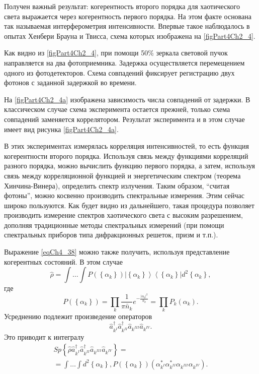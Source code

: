 Получен важный результат: когерентность второго порядка для
хаотического света выражается через когерентность первого порядка. На
этом факте основана так называемая интерферометрия
интенсивности. Впервые такое наблюдалось в опытах Хенбери Брауна и
Твисса, схема которых изображена на \autoref{figPart4Ch2_4}.



Как видно из \autoref{figPart4Ch2_4}, при помощи 50\% зеркала
световой пучок направляется на два фотоприемника. Задержка
осуществляется перемещением одного из фотодетекторов. Схема совпадений
фиксирует регистрацию двух фотонов с заданной задержкой во времени.



На \autoref{figPart4Ch2_4a} изображена зависимость числа совпадений
от задержки. В классическом случае схема эксперимента остается прежней,
только схема совпадений заменяется коррелятором. Результат
эксперимента и в этом случае имеет вид рисунка \ref{figPart4Ch2_4a}. 

В этих экспериментах измерялась корреляция интенсивностей, то есть 
функция когерентности второго порядка. Используя связь между функциями
корреляций разного порядка, можно вычислить функцию первого порядка, а
затем, используя связь между корреляционной функцией и энергетическим
спектром (теорема Хинчина-Винера), определить спектр излучения. Таким
образом, ``считая фотоны'', можно косвенно производить спектральные
измерения. Этим сейчас широко пользуются. Как будет видно из
дальнейшего, такая процедура позволяет производить измерение спектров
хаотического света с высоким разрешением, дополняя традиционные методы
спектральных измерений (при помощи спектральных приборов типа
дифракционных решеток, призм и т.п.). 

Выражение \eqref{eqCh4_38} можно также получить, используя
представление когерентных состояний. В этом случае
\begin{equation}
\hat{\rho} = \int \dots \int P\left(\left\{\alpha_k\right\}\right)
\left|\left\{\alpha_k\right\}\right>\left<\left\{\alpha_k\right\}\right|d^2 \left\{\alpha_k\right\},
\nonumber
\end{equation}
где
\begin{equation}
P\left(\left\{\alpha_k\right\}\right) = \prod_k\frac{1}{\pi
  \bar{n}_k}e^{-\frac{\left|\alpha_k\right|^2}{\bar{n}_k}}=
\prod_k P_k\left(\alpha_k\right).
\nonumber
\end{equation} 
Усреднению подлежит произведение операторов
\begin{equation}
\hat{a}^{\dag}_{k^{I}}\hat{a}^{\dag}_{k^{II}}\hat{a}_{k^{III}}\hat{a}_{k^{IV}}.
\nonumber
\end{equation}
Это приводит к интегралу
\begin{eqnarray}
Sp \left\{
\hat{\rho}
\hat{a}^{\dag}_{k^{I}}\hat{a}^{\dag}_{k^{II}}\hat{a}_{k^{III}}\hat{a}_{k^{IV}}
\right\} = 
\nonumber \\
= 
\int \dots \int 
d^2 \left\{\alpha_k\right\},
P\left(\left\{\alpha_k\right\}\right)
\left(
\alpha^{*}_{k^{I}}\alpha^{*}_{k^{II}}\alpha_{k^{III}}\alpha_{k^{IV}}
\right).
\nonumber
\end{eqnarray}

